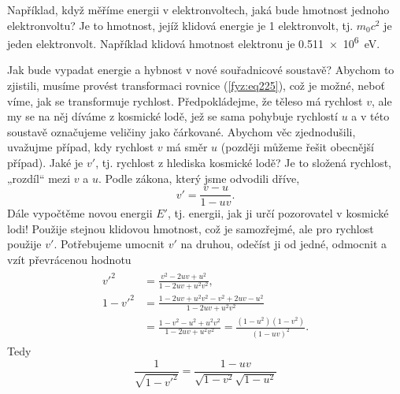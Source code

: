     Například, když měříme energii v elektronvoltech, jaká bude hmotnost jednoho elektronvoltu? Je 
    to hmotnost, jejíž klidová energie je \num{1} elektronvolt, tj. \(m_0c^2\) je jeden 
    elektronvolt. Například klidová hmotnost elektronu je \SI{0.511e6}{\electronvolt}.
    
    Jak bude vypadat energie a hybnost v nové souřadnicové soustavě? Abychom to zjistili, musíme 
    provést transformaci rovnice (\ref{fyz:eq225}), což je možné, neboť víme, jak se transformuje 
    rychlost. Předpokládejme, že těleso má rychlost \(v\), ale my se na něj díváme z kosmické lodě, 
    jež se sama pohybuje rychlostí \(u\) a v této soustavě označujeme veličiny jako čárkované. 
    Abychom věc zjednodušili, uvažujme případ, kdy rychlost \(v\) má směr \(u\) (později můžeme 
    řešit obecnější případ). Jaké je \(v'\), tj. rychlost z hlediska kosmické lodě? Je to složená 
    rychlost, „rozdíl“ mezi \(v\) a \(u\). Podle zákona, který jsme odvodili dříve,
    \begin{equation}\label{fyz:eq227}
      v' = \frac{v-u}{1-uv}.
    \end{equation}
    Dále vypočtěme novou energii \(E'\), tj. energii, jak ji určí pozorovatel v kosmické lodi! 
    Použije stejnou klidovou hmotnost, což je samozřejmé, ale pro rychlost použije \(v'\). 
    Potřebujeme umocnit \(v'\) na druhou, odečíst ji od jedné, odmocnit a vzít převrácenou hodnotu
    \begin{gather*}
      \begin{aligned}
            {v'}^2 &= \frac{v^2 - 2uv + u^2}{1 - 2uv + u^2v^2}, \\
        1 - {v'}^2 &= \frac{1 - 2uv + u^2v^2 - v^2 + 2uv - u^2}{1 - 2uv + u^2v^2}  \\
                   &= \frac{1 - v^2 - u^2 + u^2v^2}{1 - 2uv + u^2v^2}             
                    = \frac{(1-u^2)(1-v^2)}{(1 - uv)^2}.
      \end{aligned}  
    \end{gather*}
    Tedy
    \begin{equation}\label{fyz:eq228}
      \frac{1}{\sqrt{1 - {v'}^2}} = \frac{1-uv}{\sqrt{1-v^2}\sqrt{1-u^2}}
    \end{equation}

